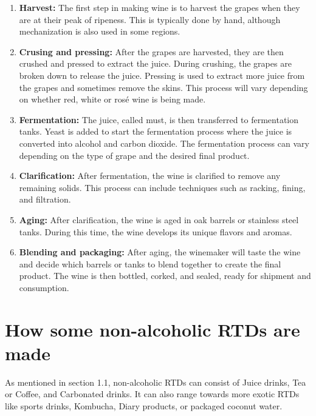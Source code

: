 \begin{enumerate}
  \item \textbf{Harvest:} The first step in making wine is to harvest the grapes when they are at their peak of ripeness. This is typically done by hand, although mechanization is also used in some regions.
  \item \textbf{Crusing and pressing:} After the grapes are harvested, they are then crushed and pressed to extract the juice. During crushing, the grapes are broken down to release the juice. Pressing is used to extract more juice from the grapes and sometimes remove the skins. This process will vary depending on whether red, white or rosé wine is being made.
  \item \textbf{Fermentation: }The juice, called must, is then transferred to fermentation tanks. Yeast is added to start the fermentation process where the juice is converted into alcohol and carbon dioxide. The fermentation process can vary depending on the type of grape and the desired final product.
  \item \textbf{Clarification: }After fermentation, the wine is clarified to remove any remaining solids. This process can include techniques such as racking, fining, and filtration.
  \item \textbf{Aging: }After clarification, the wine is aged in oak barrels or stainless steel tanks. During this time, the wine develops its unique flavors and aromas.
  \item \textbf{Blending and packaging: }After aging, the winemaker will taste the wine and decide which barrels or tanks to blend together to create the final product. The wine is then bottled, corked, and sealed, ready for shipment and consumption.
\end{enumerate}
\section{How some non-alcoholic RTDs are made}
As mentioned in section 1.1, non-alcoholic RTDs can consist of Juice drinks, Tea or Coffee, and Carbonated drinks. It can also range towards more exotic RTDs like sports drinks, Kombucha, Diary products, or packaged coconut water.  \par

